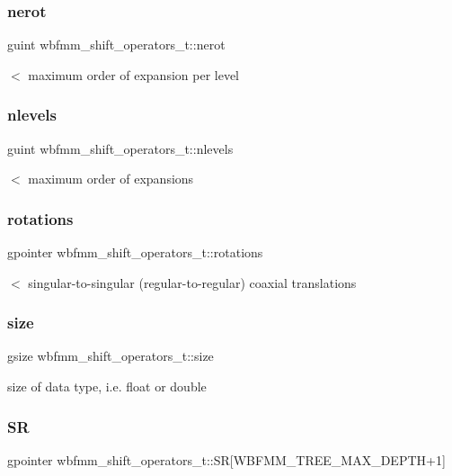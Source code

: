 \subsubsection{nerot}
{\footnotesize\ttfamily guint wbfmm\+\_\+shift\+\_\+operators\+\_\+t\+::nerot}

$<$ maximum order of expansion per level \mbox{\label{structwbfmm__shift__operators__t_a1d277299ea8f31e133ec72c76cebc70f}} 
\subsubsection{nlevels}
{\footnotesize\ttfamily guint wbfmm\+\_\+shift\+\_\+operators\+\_\+t\+::nlevels}

$<$ maximum order of expansions \mbox{\label{structwbfmm__shift__operators__t_ab6b8823249d84cd666a2fa45422253cd}} 
\subsubsection{rotations}
{\footnotesize\ttfamily gpointer wbfmm\+\_\+shift\+\_\+operators\+\_\+t\+::rotations}

$<$ singular-\/to-\/singular (regular-\/to-\/regular) coaxial translations \mbox{\label{structwbfmm__shift__operators__t_a33b218a7df0c9c1932de6f0c1b31bf85}} 
\subsubsection{size}
{\footnotesize\ttfamily gsize wbfmm\+\_\+shift\+\_\+operators\+\_\+t\+::size}

size of data type, i.\+e. float or double \mbox{\label{structwbfmm__shift__operators__t_ad2b175bb3009f69a1b9eee8155c479dc}} 
\subsubsection{SR}
{\footnotesize\ttfamily gpointer wbfmm\+\_\+shift\+\_\+operators\+\_\+t\+::\+SR[W\+B\+F\+M\+M\+\_\+\+T\+R\+E\+E\+\_\+\+M\+A\+X\+\_\+\+D\+E\+P\+TH+1]}

